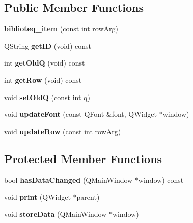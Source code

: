 \subsection*{Public Member Functions}
\begin{DoxyCompactItemize}
\item 
{\bfseries biblioteq\+\_\+item} (const int row\+Arg)\hypertarget{classbiblioteq__item_afe49e830ffa3c588e0f86f408ed09583}{}\label{classbiblioteq__item_afe49e830ffa3c588e0f86f408ed09583}

\item 
Q\+String {\bfseries get\+ID} (void) const \hypertarget{classbiblioteq__item_aa0e32c2b468b0ed6ff41915b71b4d8e4}{}\label{classbiblioteq__item_aa0e32c2b468b0ed6ff41915b71b4d8e4}

\item 
int {\bfseries get\+OldQ} (void) const \hypertarget{classbiblioteq__item_a6a23bf8eea0a6946dde80e3b33613438}{}\label{classbiblioteq__item_a6a23bf8eea0a6946dde80e3b33613438}

\item 
int {\bfseries get\+Row} (void) const \hypertarget{classbiblioteq__item_a14d2cc81d091747747094f78706f63b7}{}\label{classbiblioteq__item_a14d2cc81d091747747094f78706f63b7}

\item 
void {\bfseries set\+OldQ} (const int q)\hypertarget{classbiblioteq__item_ad234550506fe3daf2d1c2575d93427f0}{}\label{classbiblioteq__item_ad234550506fe3daf2d1c2575d93427f0}

\item 
void {\bfseries update\+Font} (const Q\+Font \&font, Q\+Widget $\ast$window)\hypertarget{classbiblioteq__item_ae66f8a9c95dbca54c1f8676853b813ac}{}\label{classbiblioteq__item_ae66f8a9c95dbca54c1f8676853b813ac}

\item 
void {\bfseries update\+Row} (const int row\+Arg)\hypertarget{classbiblioteq__item_a17b0313788c92a30a5bcd866c1266c54}{}\label{classbiblioteq__item_a17b0313788c92a30a5bcd866c1266c54}

\end{DoxyCompactItemize}
\subsection*{Protected Member Functions}
\begin{DoxyCompactItemize}
\item 
bool {\bfseries has\+Data\+Changed} (Q\+Main\+Window $\ast$window) const \hypertarget{classbiblioteq__item_aa4b679e9cc80339e07f50180986d04fc}{}\label{classbiblioteq__item_aa4b679e9cc80339e07f50180986d04fc}

\item 
void {\bfseries print} (Q\+Widget $\ast$parent)\hypertarget{classbiblioteq__item_a378140b7c2184e0efc743aa090780d5b}{}\label{classbiblioteq__item_a378140b7c2184e0efc743aa090780d5b}

\item 
void {\bfseries store\+Data} (Q\+Main\+Window $\ast$window)\hypertarget{classbiblioteq__item_a0d7b2b9d5079d2c0c979c44f0f71ad04}{}\label{classbiblioteq__item_a0d7b2b9d5079d2c0c979c44f0f71ad04}

\end{DoxyCompactItemize}

